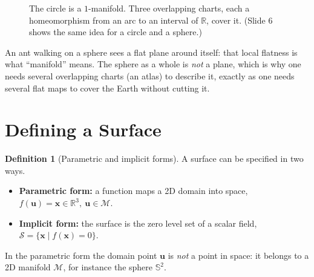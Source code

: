 \documentclass[11pt,a4paper]{article}
\newcommand{\R}{\mathbb{R}}
\newcommand{\Sph}{\mathbb{S}}
\newcommand{\M}{\mathcal{M}}
\newcommand{\Surf}{\mathcal{S}}
\newcommand{\vx}{\bm{x}}
\newcommand{\vu}{\bm{u}}
\theoremstyle{definition}
\newtheorem{definition}{Definition}[section]
\theoremstyle{plain}
\theoremstyle{remark}
\begin{document}
\begin{figure}[ht]
\centering
{}
\caption{The circle is a $1$-manifold. Three overlapping charts, each a homeomorphism from an arc to an interval of $\R$, cover it. (Slide 6 shows the same idea for a circle and a sphere.)}
\end{figure}

\begin{intuition}
An ant walking on a sphere sees a flat plane around itself: that local flatness is what ``manifold'' means. The sphere as a whole is \emph{not} a plane, which is why one needs several overlapping charts (an atlas) to describe it, exactly as one needs several flat maps to cover the Earth without cutting it.
\end{intuition}

\section{Defining a Surface }

\begin{definition}[Parametric and implicit forms]
A surface can be specified in two ways.
\begin{itemize}[nosep]
\item \textbf{Parametric form:} a function maps a 2D domain into space,
$f(\vu)=\vx\in\R^3,\ \vu\in\M$.
\item \textbf{Implicit form:} the surface is the zero level set of a scalar field, $\Surf=\{\vx\mid f(\vx)=0\}$.
\end{itemize}
In the parametric form the domain point $\vu$ is \emph{not} a point in space: it belongs to a 2D manifold $\M$, for instance the sphere $\Sph^2$.
\end{definition}
\end{document}
